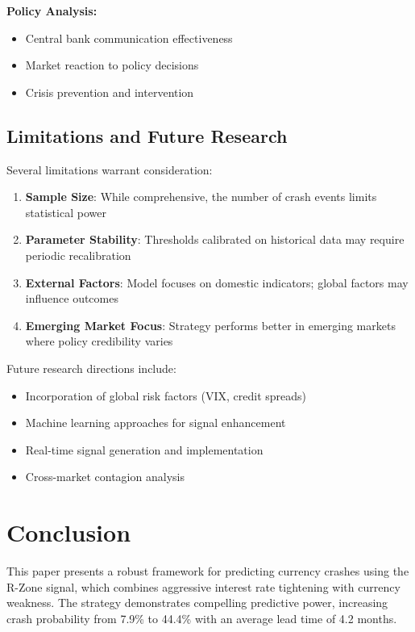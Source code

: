 \documentclass[twocolumn,ieee]{arithmaxresearch}
\begin{document}
\textbf{Policy Analysis:}
\begin{itemize}
    \item Central bank communication effectiveness
    \item Market reaction to policy decisions
    \item Crisis prevention and intervention
\end{itemize}

\subsection{Limitations and Future Research}

Several limitations warrant consideration:

\begin{enumerate}
    \item \textbf{Sample Size}: While comprehensive, the number of crash events limits statistical power
    \item \textbf{Parameter Stability}: Thresholds calibrated on historical data may require periodic recalibration
    \item \textbf{External Factors}: Model focuses on domestic indicators; global factors may influence outcomes
    \item \textbf{Emerging Market Focus}: Strategy performs better in emerging markets where policy credibility varies
\end{enumerate}

Future research directions include:
\begin{itemize}
    \item Incorporation of global risk factors (VIX, credit spreads)
    \item Machine learning approaches for signal enhancement
    \item Real-time signal generation and implementation
    \item Cross-market contagion analysis
\end{itemize}

\section{Conclusion}

This paper presents a robust framework for predicting currency crashes using the R-Zone signal, which combines aggressive interest rate tightening with currency weakness. The strategy demonstrates compelling predictive power, increasing crash probability from 7.9\% to 44.4\% with an average lead time of 4.2 months.
\end{document}
